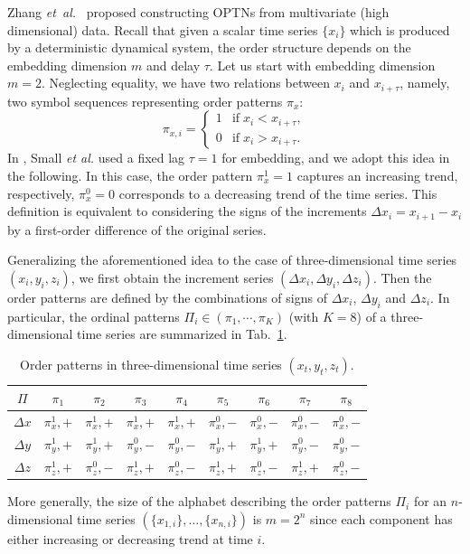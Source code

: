 		Zhang \emph{et~al.}~\cite{Zhang2017b} proposed constructing OPTNs from multivariate (high dimensional) data. Recall that given a scalar time series $\{x_i\}$ which is produced by a deterministic dynamical system, the order structure depends on the embedding dimension $m$ and delay $\tau$. Let us start with embedding dimension $m = 2$. Neglecting equality, we have two relations between $x_i$ and $x_{i+\tau}$, namely, two symbol sequences representing order patterns $\pi_{x}$:
\begin{equation} \label{piX2D_eq}
\pi_{x,i} =  \begin{cases}
 1 & \text {if} \; x_i < x_{i+\tau}, \\
 0 & \text {if} \; x_i > x_{i+\tau}. 
\end{cases}
\end{equation}
In \cite{Small2013}, Small {\textit{et al.}} used a fixed lag $\tau = 1$ for embedding, and we adopt this idea in the following. In this case, the order pattern $\pi_x^{1}=1$ captures an increasing trend, respectively, $\pi_x^{0}=0$ corresponds to a decreasing trend of the time series. This definition is equivalent to considering the signs of the increments $\Delta x_i = x_{i+1} - x_i$ by a first-order difference of the original series. 

		Generalizing the aforementioned idea to the case of three-dimensional time series $(x_i, y_i, z_i)$, we first obtain the increment series $(\Delta x_i, \Delta y_i, \Delta z_i)$. Then the order patterns are defined by the combinations of signs of $\Delta x_i$, $\Delta y_i$ and $\Delta z_i$. In particular, the ordinal patterns $\Pi_i \in (\pi_1, \cdots, \pi_K)$ (with $K = 8$) of a three-dimensional time series are summarized in Tab.~\ref{tab:3D}. 
\begin{table}
\centering
\begin{tabular}{|c|c|c|c|c|c|c|c|c|}
\hline
$\Pi$      & $\pi_1$ & $\pi_2$ & $\pi_3$ & $\pi_4$ & $\pi_5$ & $\pi_6$ & $\pi_7$
& $\pi_8$\\
\hline
$\Delta x$ & $\pi_x^{1}, + $ & $\pi_x^{1}, + $ & $\pi_x^{1}, +$ &
$\pi_x^{1}, +$ & $\pi_x^{0}, - $ & $\pi_x^{0}, - $ &
$\pi_x^{0}, -$ & $\pi_x^{0}, -$\\
\hline
$\Delta y$ & $\pi_y^{1}, + $ & $\pi_y^{1}, + $ & $\pi_y^{0}, -$ &
$\pi_y^{0}, -$ & $\pi_y^{1}, + $ & $\pi_y^{1}, + $ &
$\pi_y^{0}, -$ & $\pi_y^{0}, -$\\
\hline
$\Delta z$ & $\pi_z^{1}, + $ & $\pi_z^{0}, - $ & $\pi_z^{1}, +$ &
$\pi_z^{0}, -$ & $\pi_z^{1}, + $ & $\pi_z^{0}, - $ &
$\pi_z^{1}, +$ & $\pi_z^{0}, -$\\
\hline
\end{tabular}
\caption{Order patterns in three-dimensional time series $(x_t, y_t, z_t)$. 
\label{tab:3D}}
\end{table}
More generally, the size of the alphabet describing the order patterns $\Pi_i$ for an $n$-dimensional time series $(\{x_{1,i}\}, \ldots, \{x_{n,i}\})$ is $m = 2^{n}$ since each component has either increasing or decreasing trend at time $i$. 

